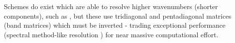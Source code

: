 Schemes do exist which are able to resolve higher wavenumbers (shorter components), such as \textcite{lele1992cfd}, but these use tridiagonal and pentadiagonal matrices (band matrices) which must be inverted - trading exceptional performance (spectral method-like resolution \cite{zhu2007caahofds}) for near massive computational effort. 